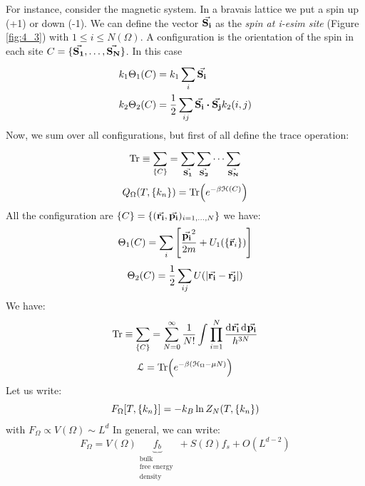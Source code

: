 \documentclass[../main/main.tex]{subfiles}
\begin{document}
For instance, consider the magnetic system. In a bravais lattice we put a spin up (+1) or down (-1). We can define the vector \( \va{S_i}  \) as the \emph{spin at i-esim site} (Figure \ref{fig:4_3}) with \( 1 \le i \le N(\Omega ) \).
A configuration is the orientation of the spin in each site \( C = \{ \va{S_1},\dots,\va{S_N} \}  \).
In this case
\begin{subequations}
\begin{align}
  k_1 \Theta _1 (C) &= k_1 \sum_{i}^{} \va{S_i}  \\
  k_2  \Theta _2 (C) &= \frac{1}{2} \sum_{ij}^{} \va{S_i} \vdot \va{S_j} k_2 (i,j)
\end{align}
\label{}
\end{subequations}
Now, we sum over all configurations, but first of all define the trace operation:
\begin{equation}
  \Tr \equiv \sum_{\{C\}}^{} = \sum_{\va{S_1} }^{} \sum_{\va{S_2} }^{}  \dots \sum_{\va{S_N} }^{}
  \label{eq:}
\end{equation}
\begin{equation}
  Q_{\Omega } (T, \{k_n\}) = \Tr(e^{-\beta \mathcal{H}(C)} )
  \label{eq:}
\end{equation}
All the configuration are \( \{C\} = \{ (\va{r_i},\va{p_i}  )_{i=1,\dots,N}\} \)
we have:
\begin{equation}
  \Theta _1 (C) = \sum_{i}^{} \qty[\frac{\va{p_i}^2 }{2m}+ U_1 (\{\va{r}_i \})]
  \label{eq:}
\end{equation}
\begin{equation}
  \Theta _2 (C) = \frac{1}{2} \sum_{ij}^{} U ( \abs{\va{r_i} - \va{r_j}  } )
  \label{eq:}
\end{equation}
We have:
\begin{equation}
  \Tr \equiv \sum_{\{C\}}^{} = \sum_{N=0}^{\infty } \frac{1}{N!} \int_{}^{} \prod_{i=1}^{N} \frac{\dd[]{\va{r_i} \dd[]{\va{p_i} } } }{h^{3N}}
  \label{eq:}
\end{equation}
\begin{equation}
  \mathcal{L} = \Tr(e^{-\beta (\mathcal{H}_\Omega - \mu N)} )
  \label{eq:}
\end{equation}
Let us write:
\begin{equation}
 F_\Omega [T, \{k_n\}]= -k_B \ln{Z_N} (T,\qty{k_n} )
  \label{eq:}
\end{equation}
with \( F_\Omega \propto V(\Omega ) \sim L^d \)
In general, we can write:
\begin{equation}
  F_\Omega = V (\Omega ) \underbrace{f_b }_{\substack{ \text{bulk} \\  \text{free energy } \\ \text{density}} } + S (\Omega ) f_s + O (L^{d-2})
  \label{eq:}
\end{equation}
\end{document}
